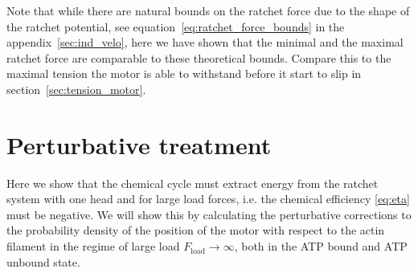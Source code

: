 \documentclass[aps,pre,twocolumn,showpacs,showkeys,superscriptaddress,floatfix]{revtex4-1}
\begin{document}
Note that while there are natural bounds on the ratchet force due to the shape of the ratchet potential, 
see equation~\eqref{eq:ratchet_force_bounds} in the appendix~\ref{sec:ind_velo}, 
here we have shown that the minimal and the maximal ratchet force are comparable to these theoretical bounds. 
Compare this to the maximal tension the motor is able to withstand before it start to slip in section~\ref{sec:tension_motor}. 


\section{Perturbative treatment}
\label{sec:perturb}
Here we show that the chemical cycle must extract energy from the ratchet system with one head and for large load forces, 
i.e. the chemical efficiency \eqref{eq:eta} must be negative. 
We will show this by calculating the perturbative corrections to the probability density of the position of the motor with respect to the actin filament in the regime of large load $F_\text{load} \to \infty$, both in the ATP bound and ATP unbound state. 
\end{document}
